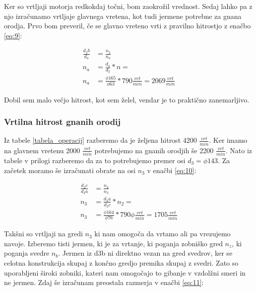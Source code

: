 Ker so vrtljaji motorja redkokdaj točni, bom zaokrožil vrednost. Sedaj 
lahko pa z njo izračunamo vrtljaje glavnega vretena, kot tudi jermene 
potrebne za gnana orodja. Prvo bom preveril, če se glavno vreteno vrti z 
pravilno hitrostjo z enačbo \ref{eq:9}:

\begin{equation}
    \label{eq:9}
    \begin{split}
        \frac{d_2b}{d_a} &= \frac{n_2}{n_a} \\
        n_a &= \frac{d_a}{d_2} * n = \\
        n_a &= \frac{\phi 165}{\phi 63} * 790 \frac{vrt}{min} = 2069 \frac{vrt}{min}
    \end{split}
\end{equation}

Dobil sem malo večjo hitrost, kot sem želel, vendar je to praktično zanemarljivo.

\subsubsection{Vrtilna hitrost gnanih orodij}
Iz tabele \ref{tabela_operacij} razberemo da je željena hitrost 4200 \(\frac{vrt}{min}\).
Ker imamo na glavnem vretenu 2000 \(\frac{vrt}{min}\) potrebujemo na gnanih orodjih
še 2200 \(\frac{vrt}{min}\). Nato iz tabele  v prilogi
razberemo da za to potrebujemo premer osi \(d_3 = \phi 143\). Za začetek moramo 
še izračunati obrate na osi \(n_3\) v enačbi \ref{eq:10}:

\begin{equation}
    \label{eq:10}
    \begin{split}
        \frac{d_2c}{d_3a} &= \frac{n_2}{n_3} \\
        n_3 &= \frac{d_3a}{d_2c} * n_2 = \\
        n_3 &= \frac{\phi 164}{\phi 76} * 790 \phi \frac{vrt}{min} = 1705 \frac{vrt}{min}
    \end{split}
\end{equation}

Takšni so vrtljaji na gredi \(n_3\) ki nam omogoča da vrtamo ali pa vrezujemo navoje. 
Izberemo tisti jermen, ki je za vrtanje, ki poganja zobniško gred \(n_z\), ki
poganja svedre \(n_b\). Jermen iz d3b ni direktno vezan na gred svedrov, 
ker se celotna konstrukcija skupaj z končno gredjo premika skupaj z 
svedri. Zato so uporabljeni široki zobniki, kateri nam omogočajo to gibanje
v vzdolžni smeri in ne jermen. Zdaj še izračunam preostala razmerja
v enačbi \ref{eq:11}:

